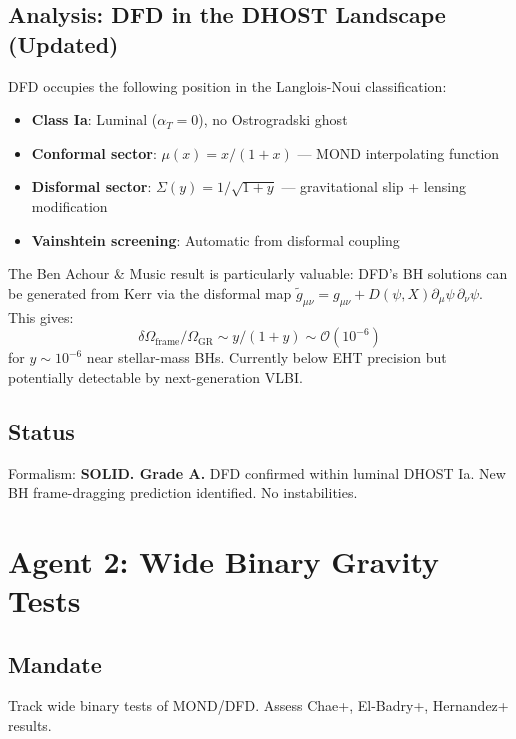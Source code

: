 \documentclass[11pt,a4paper]{article}
\begin{document}
\subsection{Analysis: DFD in the DHOST Landscape (Updated)}

DFD occupies the following position in the Langlois-Noui classification:
\begin{itemize}
\item \textbf{Class Ia}: Luminal ($\alpha_T = 0$), no Ostrogradski ghost
\item \textbf{Conformal sector}: $\mu(x) = x/(1+x)$ --- MOND interpolating function
\item \textbf{Disformal sector}: $\Sigma(y) = 1/\sqrt{1+y}$ --- gravitational slip + lensing modification
\item \textbf{Vainshtein screening}: Automatic from disformal coupling
\end{itemize}

The Ben Achour \& Music result is particularly valuable: DFD's BH solutions can be generated from Kerr via the disformal map $\tilde{g}_{\mu\nu} = g_{\mu\nu} + D(\psi, X)\partial_\mu\psi\,\partial_\nu\psi$. This gives:
\begin{equation}
\delta\Omega_\mathrm{frame} / \Omega_\mathrm{GR} \sim y / (1 + y) \sim \mathcal{O}(10^{-6})
\end{equation}
for $y \sim 10^{-6}$ near stellar-mass BHs. Currently below EHT precision but potentially detectable by next-generation VLBI.

\subsection{Status}
Formalism: \textbf{SOLID. Grade A.} DFD confirmed within luminal DHOST Ia. New BH frame-dragging prediction identified. No instabilities.

\section{Agent 2: Wide Binary Gravity Tests}

\subsection{Mandate}
Track wide binary tests of MOND/DFD. Assess Chae+, El-Badry+, Hernandez+ results.
\end{document}
